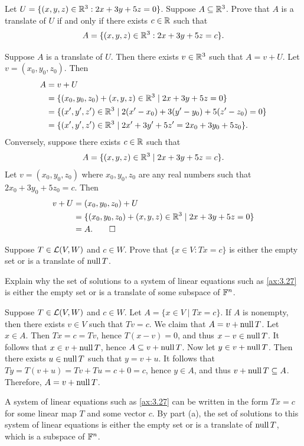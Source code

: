 \begin{exc}
\begin{exercise}
Let $U=\{(x,y,z)\in\mathbb{R}^3 : 2x+3y+5z=0\}$. Suppose $A\subseteq\mathbb{R}^3$. Prove that
$A$ is a translate of $U$ if and only if there exists $c\in\mathbb{R}$ such that
\[ A = \{(x,y,z)\in\mathbb{R}^3 : 2x+3y+5z=c\}. \]
\end{exercise}
\begin{solution}
Suppose $A$ is a translate of $U$. Then there exists $v\in\mathbb{R}^3$ such that
$A=v+U$. Let $v=(x_0,y_0,z_0)$. Then
\begin{align*}
A &= v+U\\
  &= \{(x_0,y_0,z_0)+(x,y,z)\in\mathbb{R}^3 \mid 2x+3y+5z=0\}\\
  &= \{(x',y',z')\in\mathbb{R}^3 \mid 2(x'-x_0)+3(y'-y_0)+5(z'-z_0)=0\}\\
  &= \{(x',y',z')\in\mathbb{R}^3 \mid 2x'+3y'+5z'=2x_0+3y_0+5z_0\}.
\end{align*}
Conversely, suppose there exists $c\in\mathbb{R}$ such that
\[ A = \{(x,y,z)\in\mathbb{R}^3 \mid 2x+3y+5z=c\}. \]
Let $v=(x_0,y_0,z_0)$ where $x_0,y_0,z_0$ are any real numbers such that
$2x_0+3y_0+5z_0=c$. Then
\begin{align*}
v+U &= (x_0,y_0,z_0)+U\\
    &= \{(x_0,y_0,z_0)+(x,y,z)\in\mathbb{R}^3 \mid 2x+3y+5z=0\}\\
    &= A. \qedhere
\end{align*}
\end{solution}

\begin{exercise}\leavevmode
\begin{parts}
\item Suppose $T\in\mathcal{L}(V,W)$ and $c\in W$. Prove that $\{x\in V : Tx=c\}$ is
  either the empty set or is a translate of $\operatorname{null} T$.
\item Explain why the set of solutions to a system of linear equations such as
  \ref{ax:3.27} is either the empty set or is a translate of some subspace of
  $\mathbb{F}^n$.
\end{parts}
\end{exercise}
\begin{solution}\leavevmode
\begin{parts}
\item Suppose $T\in\mathcal{L}(V,W)$ and $c\in W$. Let $A=\{x\in V \mid Tx=c\}$. If $A$
  is nonempty, then there exists $v\in V$ such that $Tv=c$. We claim that
  $A=v+\operatorname{null} T$. Let $x\in A$. Then $Tx=c=Tv$, hence $T(x-v)=0$, and thus
  $x-v\in\operatorname{null} T$. It follows that $x\in v+\operatorname{null} T$, hence $A\subseteq v+\operatorname{null} T$.
  Now let $y\in v+\operatorname{null} T$. Then there exists $u\in\operatorname{null} T$ such that $y=v+u$. It
  follows that $Ty=T(v+u)=Tv+Tu=c+0=c$, hence $y\in A$, and thus
  $v+\operatorname{null} T\subseteq A$. Therefore, $A=v+\operatorname{null} T$.
\item A system of linear equations such as \ref{ax:3.27} can be written in the
  form $Tx=c$ for some linear map $T$ and some vector $c$. By part (a), the set
  of solutions to this system of linear equations is either the empty set or is
  a translate of $\operatorname{null} T$, which is a subspace of $\mathbb{F}^n$. \qedhere
\end{parts}
\end{solution}


\end{exc}
